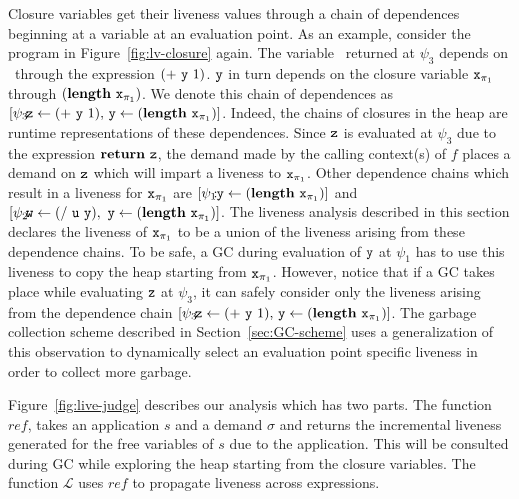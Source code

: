 \documentclass[9pt,nonatbib]{sigplanconf}
\begin{document}
 
Closure  variables  get  their  liveness values  through  a  chain  of
dependences beginning  at a  variable at an  evaluation point.   As an
example,  consider the program  in Figure~\ref{fig:lv-closure} again.
The variable  \pz\ returned  at $\psi_3$ depends  on \py\  through the
expression $(+~\mbox{\tt y}~1)$.  $\mbox{\tt y}$ in turn depends on the closure variable
$\mbox{\tt x}_{\mathit{\pi}_1}$  through $(\mathbf{length}~\mbox{\tt x}_{\mathit{\pi}_1})$.   We
denote this  chain of  dependences as  $\lbrack \psi_3\!\!\!:\!\!\!\mbox{\tt z}
\leftarrow            (+~\mbox{\tt y}~1),\,           \mbox{\tt y}            \leftarrow
(\mathbf{length}~\mbox{\tt x}_{\mathit{\pi}_1})\rbrack$.    Indeed,   the   chains   of
closures  in   the  heap  are    runtime  representations   of  these
dependences.   Since  $\mbox{\tt z}$  is  evaluated  at  $\psi_3$  due  to  the
expression $\mbox{$\mathbf{ return}$}~\mbox{\tt z}$,  the demand made by  the calling context(s)
of  $f$ places  a demand  on  $\mbox{\tt z}$ which  will impart  a liveness  to
$\mbox{\tt x}_{\pi_1}$.  Other dependence chains which result in a liveness for
$\mbox{\tt x}_{\pi_1}$    are    $\lbrack    \psi_1\!\!\!:\!\!\mbox{\tt y}    \leftarrow
(\mathbf{length}~\mbox{\tt x}_{\pi_1})\rbrack$   and  $\lbrack   \psi_2\!\!\!:\!\!\!\mbox{\tt w}
\leftarrow          (/~\mbox{\tt u}~\mbox{\tt y}),\,\,           \mbox{\tt y}          \leftarrow
(\mathbf{length}~\mbox{\tt x}_{\pi_1})\rbrack$.   The  liveness analysis  described  in
this section declares  the liveness of $\mbox{\tt x}_{\pi_1}$ to be  a union of
the liveness arising  from these dependence chains.  To be  safe, a GC
during evaluation  of $\mbox{\tt y}$ at  $\psi_1$ has  to use this  liveness to
copy the heap starting from  $\mbox{\tt x}_{\pi_1}$.  However, notice that if a
GC  takes place  while evaluating  $\mbox{\tt z}$  at $\psi_3$,  it can  safely
consider only the liveness arising from the dependence chain\linebreak
$\lbrack \psi_3\!\!\!:\!\!\!\mbox{\tt z} \leftarrow (+~\mbox{\tt y}~1),\, \mbox{\tt y} \leftarrow
(\mathbf{length}~\mbox{\tt x}_{\pi_1})\rbrack$.    The    garbage   collection   scheme
described in Section~\ref{sec:GC-scheme} uses a generalization of this
observation  to  dynamically  select   an  evaluation  point  specific
liveness in order to collect more garbage.



Figure~\ref{fig:live-judge}  describes  our  analysis  which  has  two
parts. The  function $\mathit{ref}$,  takes an  application $s$  and a
demand $\sigma$ and returns the incremental liveness generated for the
free variables of $s$ due to  the application.  This will be consulted
during GC  while exploring the heap  starting from the
closure  variables.  The function $\mathcal{L}$  uses  $\mathit{ref}$ to  propagate
liveness across expressions.
\end{document}
